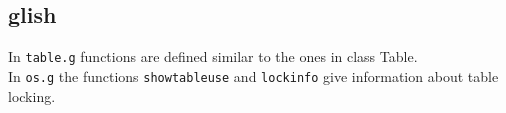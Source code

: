 \subsection{glish}
In \texttt{table.g} functions are defined similar to the ones in class Table.
\\In \texttt{os.g} the functions \texttt{showtableuse} and
\texttt{lockinfo} give information about table locking.
